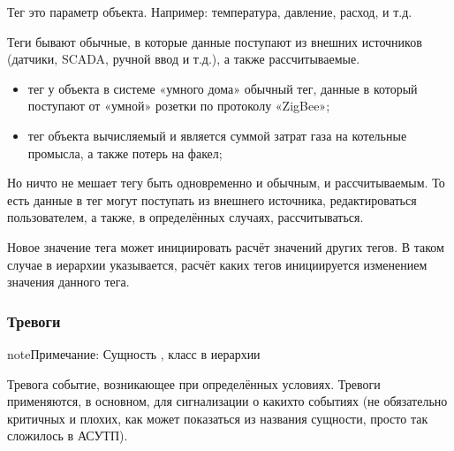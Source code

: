\documentclass[a4paper,10pt,russian]{sphinxmanual}
\begin{document}
\sphinxAtStartPar
Тег \sphinxhyphen{} это параметр объекта. Например: температура, давление, расход, и т.д.

\sphinxAtStartPar
Теги бывают обычные, в которые данные поступают из внешних источников
(датчики, SCADA, ручной ввод и т.д.), а также рассчитываемые.



\sphinxAtStartPar
{}
\begin{itemize}
\item {}
\sphinxAtStartPar
тег  у объекта  в системе «умного дома» \sphinxhyphen{}
обычный тег, данные в который поступают от «умной» розетки по протоколу
«ZigBee»;

\item {}
\sphinxAtStartPar
тег  объекта  \sphinxhyphen{}
вычисляемый и является суммой затрат газа на котельные промысла,
а также потерь на факел;

\end{itemize}

\sphinxAtStartPar
Но ничто не мешает тегу быть одновременно и обычным, и рассчитываемым. То есть
данные в тег могут поступать из внешнего источника, редактироваться
пользователем, а также, в определённых случаях, рассчитываться.



\sphinxAtStartPar
Новое значение тега может инициировать расчёт значений других тегов. В таком
случае в иерархии указывается, расчёт каких тегов инициируется изменением
значения данного тега.


\subsubsection{Тревоги}
\label{\detokenize{architecture:id8}}
\begin{sphinxadmonition}{note}{Примечание:}
\sphinxAtStartPar
Сущность , класс в иерархии 
\end{sphinxadmonition}

\sphinxAtStartPar
Тревога \sphinxhyphen{} событие, возникающее при определённых условиях. Тревоги применяются,
в основном, для сигнализации о каких\sphinxhyphen{}то событиях (не обязательно критичных и
плохих, как может показаться из названия сущности, просто так сложилось
в АСУТП).
\end{document}
